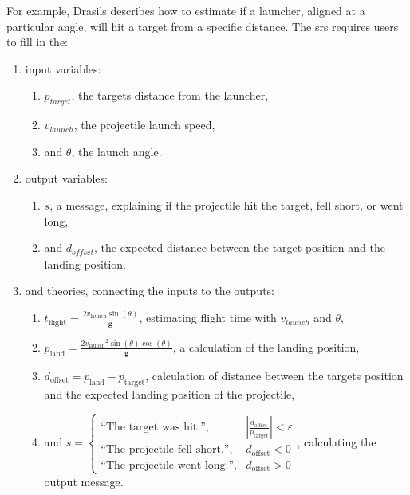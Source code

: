 For example, Drasils 
describes how to estimate if a launcher, aligned at a particular angle, will hit
a target from a specific distance. The \acs{srs} requires users to fill in the:
\begin{enumerate}
    \item input variables:
          \begin{enumerate}
              \item \(p_\mathit{target}\), the targets distance from the
                    launcher,
              \item \(v_\mathit{launch}\), the projectile launch speed,
              \item and \(\theta\), the launch angle.
          \end{enumerate}
    \item output variables:
          \begin{enumerate}
              \item \(s\), a message, explaining if the projectile hit the
                    target, fell short, or went long,
              \item and \(d_\mathit{offset}\), the expected distance between the
                    target position and the landing position.
          \end{enumerate}
    \item and theories, connecting the inputs to the outputs:
          \begin{enumerate}
              \item \({t_{\text{flight}}}=\frac{2 {v_{\text{launch}}}
                        \sin\left(\theta{}\right)}{\mathbf{g}}\), estimating
                    flight time with \(v_{\mathit{launch}}\) and \(\theta\),
              \item \({p_{\text{land}}}=\frac{2 {v_{\text{launch}}}^{2}
                        \sin\left(\theta{}\right)
                        \cos\left(\theta{}\right)}{\mathbf{g}}\), a calculation
                    of the landing position,
              \item \({d_{\text{offset}}}={p_{\text{land}}}-{p_{\text{target}}}\),
                    calculation of distance between the targets position and the
                    expected landing position of the projectile,
              \item and \(s=\begin{cases} \text{``The target was hit.''}, &
              |\frac{{d_{\text{offset}}}}{{p_{\text{target}}}}| < \varepsilon{}
              \\
              \text{``The projectile fell short.''}, & {d_{\text{offset}}} < 0 \\
              \text{``The projectile went long.''},  & {d_{\text{offset}}} >
              0\end{cases}\), \newline{}calculating the output message.
          \end{enumerate}
\end{enumerate}

